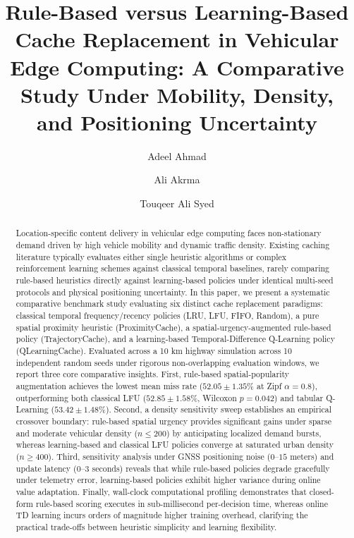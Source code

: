 \documentclass[preprint,12pt]{elsarticle}
\begin{document}
	
	\begin{frontmatter}
		
		\title{Rule-Based versus Learning-Based Cache Replacement in Vehicular Edge Computing: A Comparative Study Under Mobility, Density, and Positioning Uncertainty}
		
		\author[1]{Adeel Ahmad}
		
		\author[1,2]{Ali Akrma}
		
		\author[1]{Touqeer Ali Syed}
		
		
		\address[1]{AI Center, Faculty of Computer and Information Systems, Islamic University of Madinah, Madinah 42351, Saudi Arabia}
		
		\address[2]{AI V\&V Lab, King Fahd University of Petroleum and Minerals, Dhahran, Saudi Arabia}
		
	
		\begin{abstract}
		Location-specific content delivery in vehicular edge computing faces non-stationary demand driven by high vehicle mobility and dynamic traffic density. Existing caching literature typically evaluates either single heuristic algorithms or complex reinforcement learning schemes against classical temporal baselines, rarely comparing rule-based heuristics directly against learning-based policies under identical multi-seed protocols and physical positioning uncertainty. In this paper, we present a systematic comparative benchmark study evaluating six distinct cache replacement paradigms: classical temporal frequency/recency policies (LRU, LFU, FIFO, Random), a pure spatial proximity heuristic (ProximityCache), a spatial-urgency-augmented rule-based policy (TrajectoryCache), and a learning-based Temporal-Difference Q-Learning policy (QLearningCache). Evaluated across a 10 km highway simulation across 10 independent random seeds under rigorous non-overlapping evaluation windows, we report three core comparative insights. First, rule-based spatial-popularity augmentation achieves the lowest mean miss rate ($52.05 \pm 1.35$\% at Zipf $\alpha=0.8$), outperforming both classical LFU ($52.85 \pm 1.58$\%, Wilcoxon $p=0.042$) and tabular Q-Learning ($53.42 \pm 1.48$\%). Second, a density sensitivity sweep establishes an empirical crossover boundary: rule-based spatial urgency provides significant gains under sparse and moderate vehicular density ($n \leq 200$) by anticipating localized demand bursts, whereas learning-based and classical LFU policies converge at saturated urban density ($n \geq 400$). Third, sensitivity analysis under GNSS positioning noise ($0$--$15$ meters) and update latency ($0$--$3$ seconds) reveals that while rule-based policies degrade gracefully under telemetry error, learning-based policies exhibit higher variance during online value adaptation. Finally, wall-clock computational profiling demonstrates that closed-form rule-based scoring executes in sub-millisecond per-decision time, whereas online TD learning incurs orders of magnitude higher training overhead, clarifying the practical trade-offs between heuristic simplicity and learning flexibility.
		\end{abstract}
		

\end{frontmatter}
\end{document}
